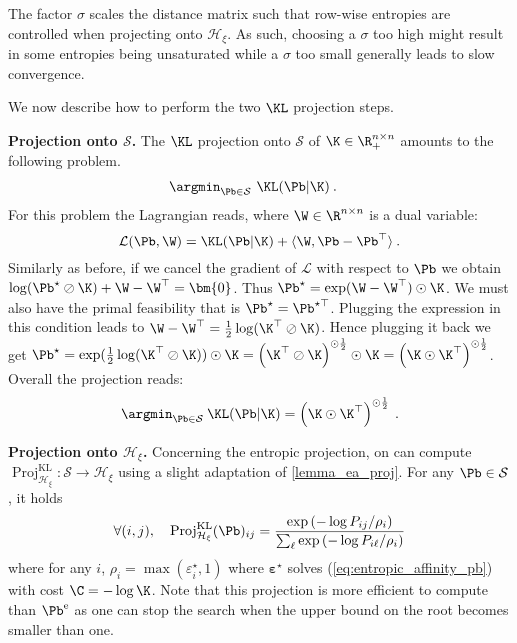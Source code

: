 The factor $\sigma$ scales the distance matrix such that row-wise entropies are controlled when projecting onto $\mathcal{H}_\xi$. As such, choosing a $\sigma$ too high might result in some entropies being unsaturated while a $\sigma$  too small generally leads to slow convergence.

We now describe how to perform the two $\KL$ projection steps. 



\textbf{Projection onto $\mathcal{S}$.} The $\KL$ projection onto $\mathcal{S}$ of $\K \in \R_+^{n \times n}$ amounts to the following problem.
\begin{align}
    \argmin_{\Pb \in \mathcal{S}} \ &\KL(\Pb | \K) \:.
\end{align}
For this problem the Lagrangian reads, where $\W \in \R^{n \times n}$ is a dual variable: 
\begin{equation}
\mathcal{L}(\Pb, \W) = \KL(\Pb | \K) +\langle \W, \Pb -\Pb^{\top} \rangle \:.
\end{equation}
Similarly as before, if we cancel the gradient of $\mathcal{L}$ with respect to $\Pb$ we obtain $\log(\Pb^\star \oslash \K) + \W - \W^\top = \bm{0}$. Thus $\Pb^\star = \exp( \W-\W^\top) \odot \K$. We must also have the primal feasibility that is $\Pb^\star = \Pb^{\star \top}$. Plugging the expression in this condition leads to $\W - \W^\top= \frac{1}{2} \log(\K^\top \oslash \K)$. Hence plugging it back we get $\Pb^\star = \exp( \frac{1}{2} \log(\K^\top \oslash \K)) \odot \K = \left(\K^\top \oslash \K \right)^{\odot \frac {1}{2}} \odot \K = \left(\K \odot \K^{\top}\right)^{\odot \frac {1}{2}}$. Overall the projection reads:
\begin{equation}
\argmin_{\Pb \in \mathcal{S}} \: \KL(\Pb | \K) = \left(\K \odot \K^{\top}\right)^{\odot \frac{1}{2}} \:.
\end{equation}

\textbf{Projection onto $\mathcal{H}_{\xi}$.}
Concerning the entropic projection, on can compute $\operatorname{Proj}^{\operatorname{KL}}_{\mathcal{H}_{\xi}} \colon \mathcal{S} \to \mathcal{H}_\xi$ using a slight adaptation of \cref{lemma_ea_proj}. For any $\Pb \in \mathcal{S}$, it holds
\begin{align}
  \forall (i,j), \quad \operatorname{Proj}^{\operatorname{KL}}_{\mathcal{H}_{\xi}}(\Pb)_{ij} =  \frac{\exp{(-\log P_{ij}/\rho_i)}}{\sum_\ell \exp{(- \log P_{i\ell}/\rho_i)}}
\end{align}
where for any $i$, $\rho_i = \max(\varepsilon^\star_i, 1)$ where $\bm{\varepsilon}^\star$ solves (\ref{eq:entropic_affinity_pb}) with cost $\C = -\log \K$. Note that this projection is more efficient to compute than $\Pb^{\mathrm{e}}$ as one can stop the search when the upper bound on the root becomes smaller than one. 

